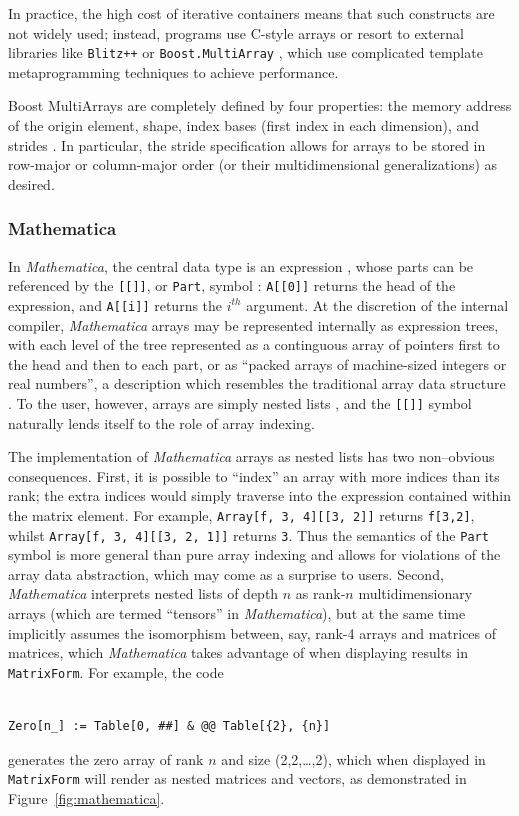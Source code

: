 \documentclass[preprint]{sigplanconf}
\newcommand{\Mathematica}{\textit{Mathematica}}
\newcommand{\code}[1]{\texttt{#1}}
\begin{document}
In practice, the high cost of iterative containers means that such constructs
are not widely used; instead, programs use C-style arrays or resort to
external libraries like \code{Blitz++} \cite{Veldhuizen:1998ab} or
\code{Boost.MultiArray} \cite{Garcia:2005ma}, which use complicated
template metaprogramming techniques to achieve performance.

Boost MultiArrays are completely defined by four properties: the memory
address of the origin element, shape, index bases (first index in each
dimension), and strides \cite{Garcia:2005ma}. In particular, the stride
specification allows for arrays to be stored in row-major or column-major
order (or their multidimensional generalizations) as desired.


\subsubsection{Mathematica}

In \Mathematica, the central data type is an expression
\cite{mathematica:expr}, whose parts can be referenced by the
\code{[[]]}, or \code{Part}, symbol \cite{mathematica:part}: \code{A[[0]]}
returns the head of the expression, and \code{A[[i]]} returns the $i^{th}$
argument. At the discretion of the internal compiler, \Mathematica{} arrays
may be represented internally as expression trees, with each level of the tree
represented as a continguous array of pointers first to the head and then to
each part, or as ``packed arrays of machine-sized integers or real numbers'',
a description which resembles the traditional array data structure
\cite{mathematica:int}. To the user, however, arrays are simply nested lists
\cite{mathematica:nl}, and the \code{[[]]} symbol naturally lends itself to
the role of array indexing.

The implementation of \Mathematica{} arrays as nested lists has two non--obvious
consequences. First, it is possible to ``index'' an array with more
indices than its rank; the extra indices would simply traverse into the
expression contained within the matrix element. For example, \code{Array[f,
{3, 4}][[3, 2]]} returns \code{f[3,2]}, whilst \code{Array[f, {3, 4}][[3, 2,
1]]} returns \code{3}. Thus the semantics of the \code{Part} symbol is more
general than pure array indexing and allows for violations of the array data
abstraction, which may come as a surprise to users. Second, \Mathematica{}
interprets nested lists of depth $n$ as rank-$n$ multidimensionary arrays
(which are termed ``tensors'' in \Mathematica), but at the same time
implicitly assumes the isomorphism between, say, rank-4 arrays and matrices of
matrices, which \Mathematica{} takes advantage of when displaying results in
\code{MatrixForm}. For example, the code
\begin{verbatim}

Zero[n_] := Table[0, ##] & @@ Table[{2}, {n}]

\end{verbatim}
generates the zero array of rank $n$ and size (2,2,\dots,2), which when 
displayed in \code{MatrixForm} will render as nested matrices and vectors, as 
demonstrated in Figure~\ref{fig:mathematica}.
\end{document}
